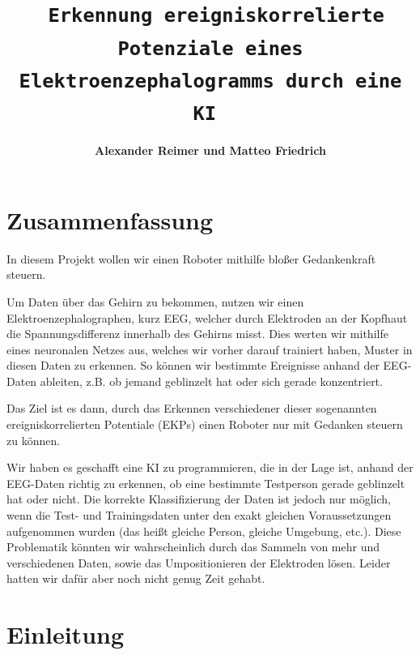 \documentclass{scrartcl}
\title{\textbf{\Huge 
\texttt{
	Erkennung ereigniskorrelierte Potenziale eines Elektroenzephalogramms durch eine KI
}
} \\ \vspace{20mm}}
\date{}
\author[]{\textbf{\huge Alexander Reimer und Matteo Friedrich}}
\affil[]{\textbf{\LARGE Gymnasium Eversten Oldenburg} \\ \vspace{10mm} \textbf{\Large Betreuer: Herr Dr. Glade \& Herr Husemeyer}}
\begin{document}
	\newcommand{\sig}{\textrm{sig}}
	\newcommand{\netin}{\textrm{netzinput}}

	\newcommand{\threesub}[1]{
	\vspace{1.5ex}
	\noindent {\textbf{#1}}
	\vspace{0.5ex}
	}

	\maketitle

	\newpage
	
	\tableofcontents
	
	\newpage

	\section{Zusammenfassung}


	In diesem Projekt wollen wir einen Roboter mithilfe bloßer Gedankenkraft steuern.

	Um Daten über das Gehirn zu bekommen, nutzen wir einen Elektroenzephalographen, kurz EEG, welcher durch Elektroden an der Kopfhaut die Spannungsdifferenz innerhalb des Gehirns misst. Dies werten wir mithilfe eines neuronalen Netzes aus, welches wir vorher darauf trainiert haben, Muster in diesen Daten zu erkennen. So können wir bestimmte Ereignisse anhand der EEG-Daten ableiten, z.B. ob jemand geblinzelt hat oder sich gerade konzentriert.
	
	Das Ziel ist es dann, durch das Erkennen verschiedener dieser sogenannten ereigniskorrelierten Potentiale (EKPs) einen Roboter nur mit Gedanken steuern zu können.
	
	
	Wir haben es geschafft eine KI zu programmieren, die in der Lage ist, anhand der EEG-Daten richtig zu erkennen, ob eine bestimmte Testperson gerade geblinzelt hat oder nicht. Die korrekte Klassifizierung der Daten ist jedoch nur möglich, wenn die Test- und Trainingsdaten unter den exakt gleichen Voraussetzungen aufgenommen wurden (das heißt gleiche Person, gleiche Umgebung, etc.). Diese Problematik könnten wir wahrscheinlich durch das Sammeln von mehr und verschiedenen Daten, sowie das Umpositionieren der Elektroden lösen. Leider hatten wir dafür aber noch nicht genug Zeit gehabt.	

	\section{Einleitung}
 
\end{document}
